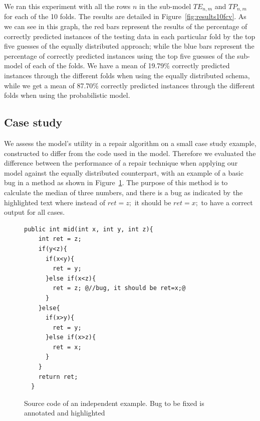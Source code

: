 \documentclass[conference]{IEEEtran}
\begin{document}
We ran this experiment with all the rows $n$ in the sub-model $TE_{n,m}$ and 
$TP_{n,m}$ for each of the 10 
folds. The results are detailed in Figure~\ref{fig:results10fcv}. As we can see 
in this graph, the red bars represent the results of the percentage of correctly 
predicted instances of the testing data in each particular fold by the top five guesses of the equally distributed approach; while the blue 
bars represent the percentage of correctly predicted instances using the top five 
guesses of the sub-model of each of the folds. We have a mean of 19.79\% 
correctly predicted instances through the different folds when using the equally 
distributed schema, while we get a mean of 87.70\% correctly predicted instances 
through the different folds when using the probabilistic model. 

\subsection{Case study}
\label{sec:casestudy}

We assess the
model's utility in a repair algorithm on a small case study example, constructed
to differ from the code used in the model.  Therefore we evaluated the difference between the performance of a repair technique when applying our model
against the equally distributed counterpart, with an example of a basic bug in a method as shown in Figure~\ref{fig:initialExample}. The purpose of this method is to calculate the median 
of three numbers, and there is a bug as indicated by the highlighted text where 
instead of $ret = z;$ it should be $ret = x;$ to have a correct output 
for all cases.



\begin{figure}[t]
\begin{lstlisting}[frame=single,style=base]
  public int mid(int x, int y, int z){
    int ret = z;  
    if(y<z){
      if(x<y){
        ret = y;
      }else if(x<z){
        ret = z; @//bug, it should be ret=x;@
      }
    }else{
      if(x>y){
        ret = y;
      }else if(x>z){
        ret = x;
      }
    }
    return ret;
  }	
	\end{lstlisting}
	\caption{Source code of an independent example. Bug to be fixed is annotated and highlighted}
	\label{fig:initialExample}
\end{figure}



\end{document}
